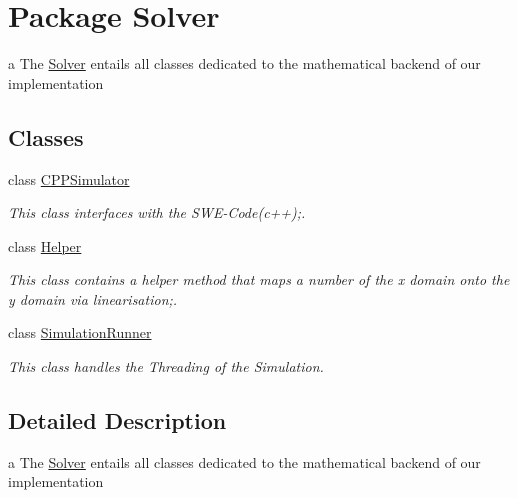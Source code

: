 \hypertarget{namespaceSolver}{}\section{Package Solver}
\label{namespaceSolver}


a The \hyperlink{namespaceSolver}{Solver} entails all classes dedicated to the mathematical backend of our implementation  


\subsection*{Classes}
\begin{DoxyCompactItemize}
\item 
class \hyperlink{classSolver_1_1CPPSimulator}{C\+P\+P\+Simulator}
\begin{DoxyCompactList}\small\item\em This class interfaces with the S\+W\+E-\/\+Code(c++);. \end{DoxyCompactList}\item 
class \hyperlink{classSolver_1_1Helper}{Helper}
\begin{DoxyCompactList}\small\item\em This class contains a helper method that maps a number of the x domain onto the y domain via linearisation;. \end{DoxyCompactList}\item 
class \hyperlink{classSolver_1_1SimulationRunner}{Simulation\+Runner}
\begin{DoxyCompactList}\small\item\em This class handles the Threading of the Simulation. \end{DoxyCompactList}\end{DoxyCompactItemize}


\subsection{Detailed Description}
a The \hyperlink{namespaceSolver}{Solver} entails all classes dedicated to the mathematical backend of our implementation 